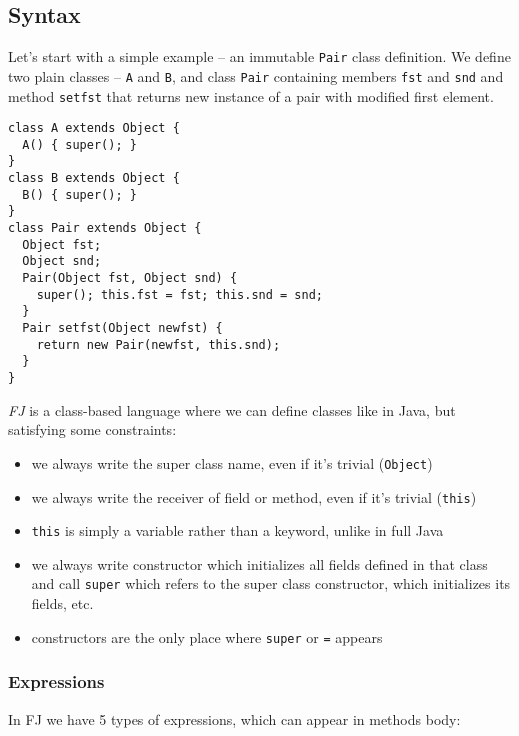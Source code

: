 \documentclass{article}[12pt]
\begin{document}
\subsection{Syntax}

Let's start with a simple example -- an immutable \texttt{Pair} class
definition. We define two plain classes -- \texttt{A} and \texttt{B},
and class \texttt{Pair} containing members \texttt{fst} and \texttt{snd}
and method \texttt{setfst} that returns new instance of a
pair with modified first element.

\begin{verbatim}
class A extends Object {
  A() { super(); }
}
class B extends Object {
  B() { super(); }
}
class Pair extends Object {
  Object fst;
  Object snd;
  Pair(Object fst, Object snd) {
    super(); this.fst = fst; this.snd = snd;
  }
  Pair setfst(Object newfst) {
    return new Pair(newfst, this.snd);
  }
}
\end{verbatim}

\emph{FJ} is a class-based language where we can define classes like in
Java, but satisfying some constraints:

\begin{itemize}
\item we always write the super class name, even if it's trivial
  (\texttt{Object})
\item we always write the receiver of field or method, even if it's
  trivial (\texttt{this})
\item \texttt{this} is simply a variable rather than a keyword, unlike
  in full Java
\item we always write constructor which initializes all fields
  defined in that class and call \texttt{super} which refers to the
  super class constructor, which initializes its fields, etc.
\item constructors are the only place where \texttt{super} or
  \texttt{=} appears
\end{itemize}

\subsubsection{Expressions}

In FJ we have 5 types of expressions, which can appear in methods body:
\end{document}
